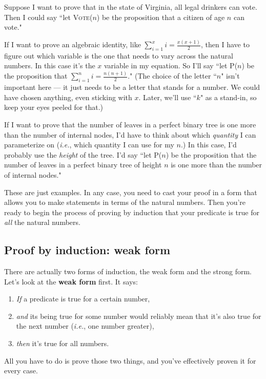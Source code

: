 Suppose I want to prove that in the state of Virginia, all legal drinkers
can vote. Then I could say ``let \textsc{Vote}($n$) be the proposition that
a citizen of age $n$ can vote."

If I want to prove an algebraic identity, like $\sum_{i=1}^x{i} =
\frac{x(x+1)}{2}$, then I have to figure out which variable is the one that
needs to vary across the natural numbers. In this case it's the $x$
variable in my equation. So I'll say ``let P($n$) be the proposition that
$\sum_{i=1}^n{i} = \frac{n(n+1)}{2}$." (The choice of the letter ``$n$"
isn't important here --- it just needs to be a letter that stands for a
number. We could have chosen anything, even sticking with $x$. Later, we'll
use ``$k$" as a stand-in, so keep your eyes peeled for that.)

If I want to prove that the number of leaves in a perfect binary tree is
one more than the number of internal nodes, I'd have to think about which
\textit{quantity} I can parameterize on (\textit{i.e.}, which quantity I
can use for my $n$.) In this case, I'd probably use the \textit{height} of
the tree. I'd say ``let P($n$) be the proposition that the number of leaves
in a perfect binary tree of height $n$ is one more than the number of
internal nodes."

These are just examples. In any case, you need to cast your proof in a form
that allows you to make statements in terms of the natural numbers. Then
you're ready to begin the process of proving by induction that your
predicate is true for \textit{all} the natural numbers.

\subsection{Proof by induction: weak form}

There are actually two forms of induction, the weak form and the strong
form. Let's look at the \textbf{weak form} first. It says:
\begin{enumerate}
\item \label{basecaseweak} \textit{If} a predicate is true for a certain number,
\item \label{inductivestepweak} \textit{and} its being true for some number
would reliably mean that it's also true for the next number (\textit{i.e.},
one number greater), 
\item \textit{then} it's true for all numbers.
\end{enumerate}
All you have to do is prove those two things, and you've effectively proven
it for every case.

